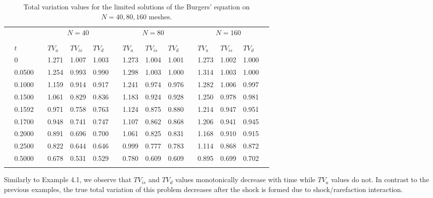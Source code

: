 \documentclass[reqno,a4paper,12pt]{amsart}
\begin{document}
\begin{table}[htb!]
    \centering
    \begin{tabular}{@{}clclllclllclllc@{}}
        \toprule
        & & {} & \multicolumn{3}{c}{$N = 40$} & {} & \multicolumn{3}{c}{$N = 80$} & {} & \multicolumn{3}{c}{$N = 160$} \\
        \cmidrule{4-6} \cmidrule{8-10} \cmidrule{12-14} \\
        & $t$ & {} & $TV_a$ & $TV_{is}$ & $TV_{d}$ & {} & $TV_a$ & $TV_{is}$ & $TV_{d}$ & {} & $TV_a$ & $TV_{is}$ & $TV_{d}$ \\
        \midrule
        & 0      & {} & 1.271 & 1.007 &	1.003 &	{} & 1.273 & 1.004 & 1.001 & {} & 1.273 & 1.002 & 1.000 & \\
        & 0.0500 & {} & 1.254 & 0.993 & 0.990 & {} & 1.298 & 1.003 & 1.000 & {} & 1.314 & 1.003 & 1.000 & \\
        & 0.1000 & {} & 1.159 & 0.914 & 0.917 & {} & 1.241 & 0.974 & 0.976 & {}	& 1.282 & 1.006 & 0.997 & \\
        & 0.1500 & {} & 1.061 &	0.829 & 0.836 & {} & 1.183 & 0.924 & 0.928 & {} & 1.250 & 0.978 & 0.981 & \\
        & 0.1592 & {} & 0.971 &	0.758 &	0.763 & {} & 1.124 & 0.875 & 0.880 & {} & 1.214 & 0.947 & 0.951 & \\
        & 0.1700 & {} & 0.948 &	0.741 &	0.747 & {} & 1.107 & 0.862 & 0.868 & {} & 1.206 & 0.941 & 0.945 & \\
        & 0.2000 & {} & 0.891 &	0.696 &	0.700 & {} & 1.061 & 0.825 & 0.831 & {} & 1.168 & 0.910	& 0.915 & \\
        & 0.2500 & {} & 0.822 &	0.644 &	0.646 & {} & 0.999 & 0.777 & 0.783 & {}	& 1.114	& 0.868 & 0.872 & \\
        & 0.5000 & {} & 0.678 & 0.531 & 0.529 & {} & 0.780 & 0.609 & 0.609 & {} & 0.895 & 0.699 & 0.702 & \\
        \bottomrule\\
    \end{tabular}
    \caption{Total variation values for the limited solutions of the Burgers' equation on $N = 40,80,160$ meshes.}
    \label{table:4}
\end{table}

Similarly to Example 4.1, we observe that $TV_{is}$ and $TV_d$ values monotonically decrease with time while $TV_a$ values do not. In contrast to the previous examples, the true total variation of this problem decreases after the shock is formed due to shock/rarefaction interaction. 
\end{document}

